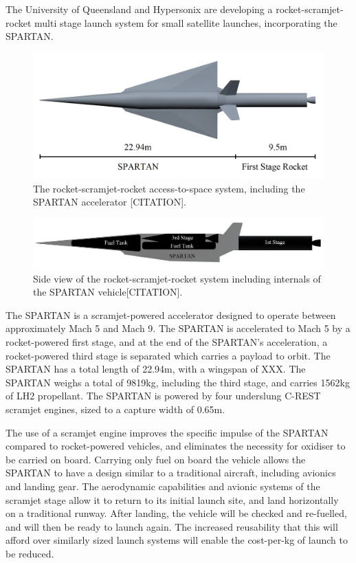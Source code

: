 \documentclass[conf]{new-aiaa}
\begin{document}
The University of Queensland and Hypersonix are developing a rocket-scramjet-rocket multi stage launch system for small satellite launches, incorporating the SPARTAN\cite{Preller2017}. 
\begin{figure}
	\centering
	\includegraphics[width=0.7\linewidth]{Figures/NoInternal}
	\caption{The rocket-scramjet-rocket access-to-space system, including the SPARTAN accelerator [CITATION].}
	\label{fig:NoInternal}
\end{figure}
\begin{figure}
	\centering
	\includegraphics[width=0.7\linewidth]{Figures/INTERNALS}
	\caption{Side view of the rocket-scramjet-rocket system including internals of the SPARTAN vehicle[CITATION].}
	\label{fig:INTERNALS}
\end{figure}
The SPARTAN is a scramjet-powered accelerator designed to operate between approximately Mach 5 and Mach 9. The SPARTAN is accelerated to Mach 5 by a rocket-powered first stage, and at the end of the SPARTAN's acceleration, a rocket-powered third stage is separated which carries a payload to orbit. 
The SPARTAN has a total length of 22.94m, with a wingspan of XXX. The SPARTAN weighs a total of 9819kg, including the third stage, and carries 1562kg of LH2 propellant. The SPARTAN is powered by four underslung C-REST scramjet engines, sized to a capture width of 0.65m.


The use of a scramjet engine improves the specific impulse of the SPARTAN compared to rocket-powered vehicles, and eliminates the necessity for oxidiser to be carried on board. Carrying only fuel on board the vehicle allows the SPARTAN to have a design similar to a traditional aircraft, including avionics and landing gear. The aerodynamic capabilities and avionic systems of the scramjet stage allow it to return to its initial launch site, and land horizontally on a traditional runway. After landing, the vehicle will be checked and re-fuelled, and will then be ready to launch again. The increased reusability that this will afford over similarly sized launch systems will enable the cost-per-kg of launch to be reduced. 
\end{document}
